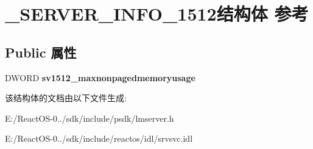 \hypertarget{struct___s_e_r_v_e_r___i_n_f_o__1512}{}\section{\+\_\+\+S\+E\+R\+V\+E\+R\+\_\+\+I\+N\+F\+O\+\_\+1512结构体 参考}
\label{struct___s_e_r_v_e_r___i_n_f_o__1512}
\subsection*{Public 属性}
\begin{DoxyCompactItemize}
\item 
\mbox{\label{struct___s_e_r_v_e_r___i_n_f_o__1512_aa53058654f29a06226856d06972da42b}} 
D\+W\+O\+RD {\bfseries sv1512\+\_\+maxnonpagedmemoryusage}
\end{DoxyCompactItemize}


该结构体的文档由以下文件生成\+:\begin{DoxyCompactItemize}
\item 
E\+:/\+React\+O\+S-\/0../sdk/include/psdk/lmserver.\+h\item 
E\+:/\+React\+O\+S-\/0../sdk/include/reactos/idl/srvsvc.\+idl\end{DoxyCompactItemize}
